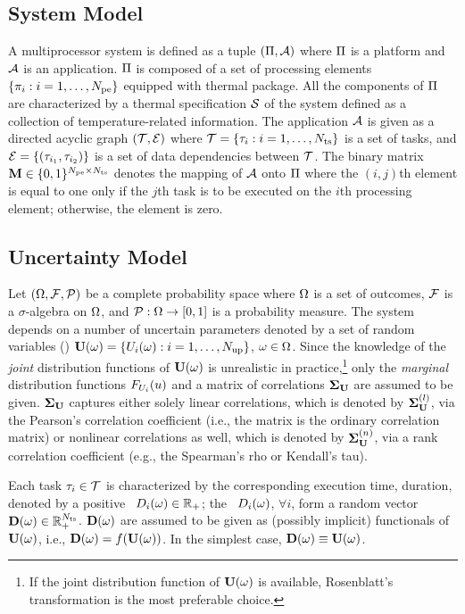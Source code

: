 \subsection{System Model}
A multiprocessor system is defined as a tuple $(\Pi, \mathcal{A})$ where $\Pi$ is a platform and $\mathcal{A}$ is an application. $\Pi$ is composed of a set of processing elements $\{ \pi_i: i = 1, \dots, {N_\text{pe}} \}$ equipped with thermal package. All the components of $\Pi$ are characterized by a thermal specification $\mathcal{S}$ of the system defined as a collection of temperature-related information. The application $\mathcal{A}$ is given as a directed acyclic graph $(\mathcal{T}, \mathcal{E})$ where $\mathcal{T} = \{ \tau_i: i = 1, \dots, {N_\text{ts}} \}$ is a set of tasks, and $\mathcal{E} = \{ (\tau_{i_1}, \tau_{i_2}) \}$ is a set of data dependencies between $\mathcal{T}$. The binary matrix $\mathbf{M} \in \{ 0, 1 \}^{{N_\text{pe}} \times {N_\text{ts}}}$ denotes the mapping of $\mathcal{A}$ onto $\Pi$ where the $(i, j)$th element is equal to one only if the $j$th task is to be executed on the $i$th processing element; otherwise, the element is zero.

\subsection{Uncertainty Model}
Let $(\Omega, \mathcal{F}, \mathcal{P})$ be a complete probability space where $\Omega$ is a set of outcomes, $\mathcal{F}$ is a $\sigma$-algebra on $\Omega$, and $\mathcal{P}: \Omega \to [0, 1]$ is a probability measure. The system depends on a number of uncertain parameters denoted by a set of random variables (\rvs) $\mathbf{U}(\omega) = \{ U_i(\omega): i = 1, \dots, {N_\text{up}} \}$, $\omega \in \Omega$. Since the knowledge of the \emph{joint} distribution functions of $\mathbf{U}(\omega)$ is unrealistic in practice,\footnote{If the joint distribution function of $\mathbf{U}(\omega)$ is available, Rosenblatt's transformation is the most preferable choice.} only the \emph{marginal} distribution functions $F_{U_i}(u)$ and a matrix of correlations $\mathbf{\Sigma}_{\mathbf{U}}$ are assumed to be given. $\mathbf{\Sigma}_{\mathbf{U}}$ captures either solely linear correlations, which is denoted by $\mathbf{\Sigma}^{(l)}_{\mathbf{U}}$, via the Pearson's correlation coefficient (i.e., the matrix is the ordinary correlation matrix) or nonlinear correlations as well, which is denoted by $\mathbf{\Sigma}^{(n)}_{\mathbf{U}}$, via a rank correlation coefficient (e.g., the Spearman's rho or Kendall's tau).

Each task $\tau_i \in \mathcal{T}$ is characterized by the corresponding execution time, duration, denoted by a positive \rv\ $D_i(\omega) \in \mathbb{R}_+$; the \rvs\ $D_i(\omega)$, $\forall i$, form a random vector $\mathbf{D}(\omega) \in \mathbb{R}^{N_\text{ts}}_+$. $\mathbf{D}(\omega)$ are assumed to be given as (possibly implicit) functionals of $\mathbf{U}(\omega)$, i.e., $\mathbf{D}(\omega) = f(\mathbf{U}(\omega))$. In the simplest case, $\mathbf{D}(\omega) \equiv \mathbf{U}(\omega)$.
